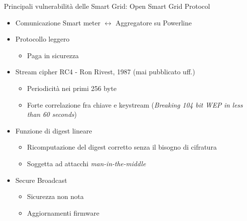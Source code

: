 \begin{frame}{Principali vulnerabilità delle Smart Grid: Open Smart Grid Protocol}
	\begin{itemize}[<+- | alert@+>]
		\item Comunicazione Smart meter $\leftrightarrow$ Aggregatore su Powerline
		\item Protocollo leggero
		\begin{itemize}
			\item Paga in sicurezza
		\end{itemize}
		\item Stream cipher RC4 - Ron Rivest, 1987 (mai pubblicato uff.)
		\begin{itemize}
			\item Periodicità nei primi 256 byte
			\item Forte correlazione fra chiave e keystream (\textit{Breaking 104 bit WEP in less than 60 seconds})
		\end{itemize}
		\item Funzione di digest lineare
		\begin{itemize}
			\item Ricomputazione del digest corretto senza il bisogno di cifratura
			\item Soggetta ad attacchi \textit{man-in-the-middle}
		\end{itemize}
		\item Secure Broadcast
		\begin{itemize}
			\item Sicurezza non nota
			\item Aggiornamenti firmware
		\end{itemize}
	\end{itemize}
\end{frame}


